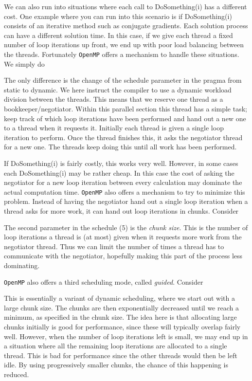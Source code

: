 \documentclass[twoside, 11pt, a4paper]{article}
\begin{document}
We can also run into situations where each call to DoSomething(i) has a different cost.
One example where you can run into this scenario is if DoSomething(i) consists of an
iterative method such as conjugate gradients. Each solution process can have a different
solution time. In this case, if we give each thread a fixed number of loop iterations up front,
we end up with poor load balancing between the threads. Fortunately \texttt{OpenMP}
offers a mechanism to handle these situations. We simply do

The only difference is the change of the schedule parameter in the pragma from static to dynamic. 
We here instruct the compiler to use a dynamic workload division between the threads. This means 
that we reserve one thread 
as a bookkeeper/negotiator. Within this parallel section this thread has a simple task; keep
track of which loop iterations have been performed and hand out a new one to a thread when it
requests it. Initially each thread is given a single loop iteration to perform. Once the thread
finishes this, it asks the negotiator thread for a new one. The threads keep doing this until all
work has been performed.

If DoSomething(i) is fairly costly, this works very well.
However, in some cases each DoSomething(i) may be rather cheap. In this case the cost of
asking the negotiator for a new loop iteration between every calculation may dominate the actual computation time.
\texttt{OpenMP} also offers a mechanism to try to minimize this problem. Instead of having the negotiator 
hand out a single loop iteration when a thread asks for more work, it can hand out loop iterations in chunks. 
Consider

The second parameter in the schedule (5) is the \emph{chunk size}.
This is the number of loop iterations a thread is (at most) given when it requests more work from the
negotiator thread. Thus we can limit the number of times a thread has to communicate with the negotiator,
hopefully making this part of the process less dominating.

\texttt{OpenMP} also offers a third scheduling mode, called \emph{guided}.
Consider


This is essentially a variant
of dynamic scheduling, where we start out with a large chunk size. The chunks are then exponentially
decreased until we reach a minimum, as specified in the chunk size. The idea here is that allocating
large chunks initially is good for performance, since these will typically overlap fairly well.
However, when the number of loop iterations left is small, we may end up in a situation where all
the remaining loop iterations are allocated to a single thread. This is bad for performance since
the other threads would then be left idle. By using progressively smaller chunks, the
chance of this happening is reduced.
\end{document}
